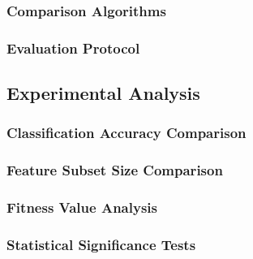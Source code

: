 \subsubsection{Comparison Algorithms}

\subsubsection{Evaluation Protocol}

\subsection{Experimental Analysis}

\subsubsection{Classification Accuracy Comparison}

\subsubsection{Feature Subset Size Comparison}

\subsubsection{Fitness Value Analysis}

\subsubsection{Statistical Significance Tests}

